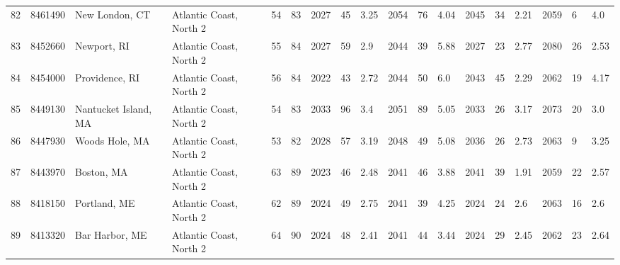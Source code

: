 \begin{longtable}{llllllllllllllllll}
82 &          8461490 &              New London, CT &  Atlantic Coast, North 2 &              54 &       83 &                      2027 &   45 &   3.25 &     2054 &   76 &   4.04 &                          2045 &  34 &  2.21 &     2059 &    6 &   4.0 \\
83 &          8452660 &                 Newport, RI &  Atlantic Coast, North 2 &              55 &       84 &                      2027 &   59 &    2.9 &     2044 &   39 &   5.88 &                          2027 &  23 &  2.77 &     2080 &   26 &  2.53 \\
84 &          8454000 &              Providence, RI &  Atlantic Coast, North 2 &              56 &       84 &                      2022 &   43 &   2.72 &     2044 &   50 &    6.0 &                          2043 &  45 &  2.29 &     2062 &   19 &  4.17 \\
85 &          8449130 &        Nantucket Island, MA &  Atlantic Coast, North 2 &              54 &       83 &                      2033 &   96 &    3.4 &     2051 &   89 &   5.05 &                          2033 &  26 &  3.17 &     2073 &   20 &   3.0 \\
86 &          8447930 &              Woods Hole, MA &  Atlantic Coast, North 2 &              53 &       82 &                      2028 &   57 &   3.19 &     2048 &   49 &   5.08 &                          2036 &  26 &  2.73 &     2063 &    9 &  3.25 \\
87 &          8443970 &                  Boston, MA &  Atlantic Coast, North 2 &              63 &       89 &                      2023 &   46 &   2.48 &     2041 &   46 &   3.88 &                          2041 &  39 &  1.91 &     2059 &   22 &  2.57 \\
88 &          8418150 &                Portland, ME &  Atlantic Coast, North 2 &              62 &       89 &                      2024 &   49 &   2.75 &     2041 &   39 &   4.25 &                          2024 &  24 &   2.6 &     2063 &   16 &   2.6 \\
89 &          8413320 &              Bar Harbor, ME &  Atlantic Coast, North 2 &              64 &       90 &                      2024 &   48 &   2.41 &     2041 &   44 &   3.44 &                          2024 &  29 &  2.45 &     2062 &   23 &  2.64 \\
\end{longtable}
